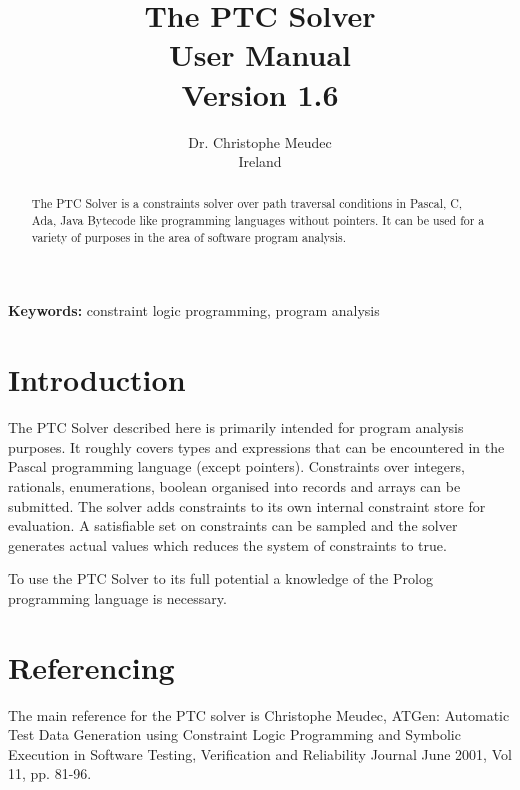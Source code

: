 \documentclass{article}
\begin{document}
\title{The PTC Solver\\
       User Manual\\
       Version 1.6}
\author{Dr. Christophe Meudec \\
        Ireland}
\maketitle

\begin{abstract}
The PTC Solver is a constraints solver over path traversal conditions in Pascal,
C, Ada, Java Bytecode like programming languages without pointers. It
can be used for a variety of purposes in the area of software program analysis.
\end{abstract}


\noindent\textbf{Keywords:} constraint logic programming, program analysis

\section{Introduction}

The PTC Solver described here is primarily intended for program analysis
purposes.
It roughly covers types and expressions that can be encountered in the Pascal
programming language (except pointers). Constraints over integers, rationals,
enumerations, boolean organised into records and arrays can be submitted. The
solver adds constraints to its own internal constraint store for evaluation. A
satisfiable set on constraints can be sampled and the solver generates actual
values which reduces the system of constraints to true.

To use the PTC Solver to its full potential a knowledge of
the Prolog programming language is necessary.

\section{Referencing}

The main reference for the PTC solver is Christophe Meudec,
ATGen: Automatic Test Data Generation using Constraint Logic Programming and
Symbolic Execution
in Software Testing, Verification and Reliability Journal
June 2001, Vol 11, pp. 81-96.

\end{document}

